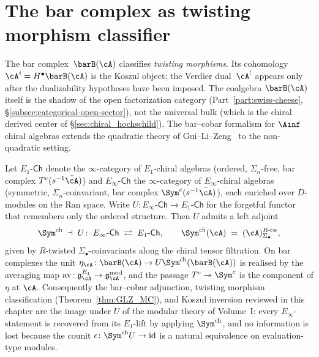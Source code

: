 \section{The bar complex as twisting morphism classifier}
\label{sec:bar_cobar}

The bar complex~$\barB(\cA)$ classifies \emph{twisting morphisms}.
Its cohomology $\cA^i = H^\bullet\barB(\cA)$ is the Koszul object;
the Verdier dual~$\cA^!$ appears only after the dualizability
hypotheses have been imposed. The coalgebra $\barB(\cA)$ itself is
the shadow of the open factorization category
(Part~\ref{part:swiss-cheese}, \S\ref{subsec:categorical-open-sector}),
not the universal bulk (which is the chiral derived center of
\S\ref{sec:chiral_hochschild}). The bar--cobar formalism for
$\Ainf$ chiral algebras extends the quadratic theory of
Gui--Li--Zeng~\cite{GLZ22} to the non-quadratic setting.

\begin{proposition}
\label{prop:bar-cobar-e1-primacy-adjunction}
Let $E_1\text{-}\mathsf{Ch}$ denote the $\infty$-category of $E_1$-chiral
algebras (ordered, $\Sigma_n$-free, bar complex $T^c(s^{-1}\bar\cA)$) and
$E_\infty\text{-}\mathsf{Ch}$ the $\infty$-category of $E_\infty$-chiral
algebras (symmetric, $\Sigma_n$-coinvariant, bar complex
$\Sym^c(s^{-1}\bar\cA)$), each enriched over $D$-modules on the
Ran space. Write $U\colon E_\infty\text{-}\mathsf{Ch} \to
E_1\text{-}\mathsf{Ch}$ for the forgetful functor that remembers only the
ordered structure. Then $U$ admits a left adjoint
\begin{equation}
\label{eq:sym-ch-U-adjunction}
\Sym^{\mathrm{ch}} \;\dashv\; U\colon\;
E_\infty\text{-}\mathsf{Ch} \;\rightleftarrows\; E_1\text{-}\mathsf{Ch},
\qquad
\Sym^{\mathrm{ch}}(\cA) \;=\; (\cA)_{\Sigma_\bullet}^{R\text{-tw}},
\end{equation}
given by $R$-twisted $\Sigma_\bullet$-coinvariants along the chiral
tensor filtration. On bar complexes the unit
$\eta_\cA\colon \barB(\cA) \to U\Sym^{\mathrm{ch}}(\barB(\cA))$
is realised by the averaging map
$\mathrm{av}\colon \mathfrak{g}^{E_1}_\cA \to
\mathfrak{g}^{\mathrm{mod}}_\cA$, and the passage
$T^c \twoheadrightarrow \Sym^c$ is the component of $\eta$ at
$\cA$. Consequently the bar--cobar adjunction, twisting morphism
classification (Theorem~\ref{thm:GLZ_MC}), and Koszul inversion
reviewed in this chapter are the image under $U$ of the modular
theory of Volume~I: every $E_\infty$-statement is recovered from
its $E_1$-lift by applying $\Sym^{\mathrm{ch}}$, and no information
is lost because the counit $\epsilon\colon \Sym^{\mathrm{ch}} U \to
\mathrm{id}$ is a natural equivalence on evaluation-type modules.
\end{proposition}

